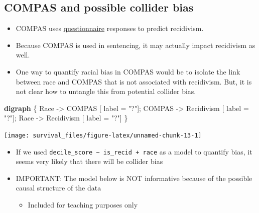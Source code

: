 \documentclass[
]{article}
\newenvironment{Shaded}{\begin{snugshade}}{\end{snugshade}}
\newcommand{\AttributeTok}[1]{\textcolor[rgb]{0.77,0.63,0.00}{#1}}
\newcommand{\CommentTok}[1]{\textcolor[rgb]{0.56,0.35,0.01}{\textit{#1}}}
\newcommand{\KeywordTok}[1]{\textcolor[rgb]{0.13,0.29,0.53}{\textbf{#1}}}
\newcommand{\OtherTok}[1]{\textcolor[rgb]{0.56,0.35,0.01}{#1}}
\newcommand{\StringTok}[1]{\textcolor[rgb]{0.31,0.60,0.02}{#1}}
\newcommand{\VariableTok}[1]{\textcolor[rgb]{0.00,0.00,0.00}{#1}}
\providecommand{\tightlist}{%
  \setlength{\itemsep}{0pt}\setlength{\parskip}{0pt}}
\begin{document}
\hypertarget{compas-and-possible-collider-bias}{%
\subsection{COMPAS and possible collider
bias}\label{compas-and-possible-collider-bias}}

\begin{itemize}
\item
  COMPAS uses
  \href{https://www.documentcloud.org/documents/2702103-Sample-Risk-Assessment-COMPAS-CORE.html}{questionnaire}
  responses to predict recidivism.
\item
  Because COMPAS is used in sentencing, it may actually impact
  recidivism as well.
\item
  One way to quantify racial bias in COMPAS would be to isolate the link
  between race and COMPAS that is not associated with recidivism. But,
  it is not clear how to untangle this from potential collider bias.
\end{itemize}

\begin{Shaded}
\begin{Highlighting}[]
\KeywordTok{digraph} \OtherTok{\{}
\CommentTok{  }\VariableTok{Race}\CommentTok{ }\OtherTok{{-}\textgreater{}}\CommentTok{ }\VariableTok{COMPAS}\CommentTok{ }\OtherTok{[}\CommentTok{ }\AttributeTok{label}\CommentTok{ }\OtherTok{=}\CommentTok{ }\StringTok{"?"}\OtherTok{];}
\CommentTok{  }\VariableTok{COMPAS}\CommentTok{ }\OtherTok{{-}\textgreater{}}\CommentTok{ }\VariableTok{Recidivism}\CommentTok{ }\OtherTok{[}\CommentTok{ }\AttributeTok{label}\CommentTok{ }\OtherTok{=}\CommentTok{ }\StringTok{"?"}\OtherTok{];}\CommentTok{ }
\CommentTok{  }\VariableTok{Race}\CommentTok{ }\OtherTok{{-}\textgreater{}}\CommentTok{ }\VariableTok{Recidivism}\CommentTok{ }\OtherTok{[}\CommentTok{ }\AttributeTok{label}\CommentTok{ }\OtherTok{=}\CommentTok{ }\StringTok{"?"}\OtherTok{]}
\CommentTok{  }\OtherTok{\}}
\end{Highlighting}
\end{Shaded}

\texttt{[image: survival\_files/figure-latex/unnamed-chunk-13-1]}

\begin{itemize}
\item
  If we used
  \texttt{decile\_score\ \textasciitilde{}\ is\_recid\ +\ race} as a
  model to quantify bias, it seems very likely that there will be
  collider bias
\item
  IMPORTANT: The model below is NOT informative because of the possible
  causal structure of the data

  \begin{itemize}
  \tightlist
  \item
    Included for teaching purposes only
  \end{itemize}
\end{itemize}
\end{document}
